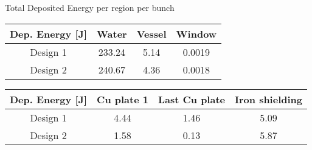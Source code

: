 \documentclass[xcolor={dvipsnames}]{beamer}
\begin{document}
\begin{frame}{Total Deposited Energy per region per bunch}

\begin{center}
\begin{tabular}{|c|c|c|c|}
\hline
 Dep. Energy [J] & \textbf{Water} & \textbf{Vessel} & \textbf{Window} \\
\hline
Design 1 & 233.24 & 5.14 & 0.0019\\
\hline
\hline
Design 2 & 240.67 & 4.36 & 0.0018\\
\hline
\end{tabular}
\end{center}
\begin{center}
\begin{tabular}{|c|c|c|c|}
\hline
 Dep. Energy [J] & \textbf{Cu plate 1} & \textbf{Last Cu plate} & \textbf{Iron shielding} \\
\hline
Design 1 & 4.44 & 1.46 & 5.09\\
\hline
\hline
Design 2 & 1.58 & 0.13 & 5.87\\
\hline
\end{tabular}
\end{center}


\end{frame}
\end{document}
